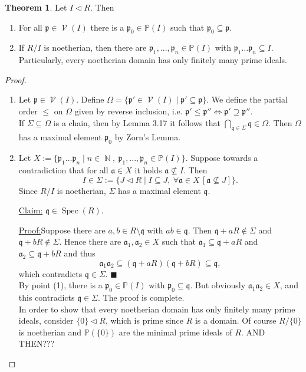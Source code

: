 \documentclass[12pt,a4paper]{report}
\theoremstyle{definition}
\newtheorem{theorem}{Theorem}[chapter] %
\theoremstyle{num.custom-title}
\newenvironment{claim}[1]{\par\noindent\underline{Claim#1:}\space}{} %
\newenvironment{claimproof}[1]{\par\noindent\underline{Proof:}\space#1}{\leavevmode\unskip\penalty9999 \hbox{}\nobreak\hfill\quad\hbox{$\blacksquare$}} %
\DeclareMathOperator{\N}{\mathbb{N}}
\DeclareMathOperator{\V}{\mathcal{V}}
\DeclareMathOperator{\sm}{\setminus}
\DeclareMathOperator{\sse}{\subseteq}
\DeclareMathOperator{\Spec}{Spec}
\newcommand{\p}{\mathfrak{p}}
\renewcommand{\P}{\mathbb{P}}
\begin{document}
\begin{theorem}
Let $I \lhd R$. Then
\begin{enumerate}
\item For all $\p \in \V(I)$ there is a $\p_0 \in \P(I)$ such that $\p_0 \sse \p$.
\item If $R/I$ is noetherian, then there are $\p_1,...,\p_n \in \P(I)$ with $\p_1 \ldots \p_n \sse I$. Particularly, every noetherian domain has only finitely many prime ideals.
\end{enumerate}
\begin{proof}\ 
\begin{enumerate}
\item Let $\p \in \V(I)$. Define $\Omega = \{ \p' \in \V(I) \mid \p' \sse \p \}$. We define the partial order $\leq$ on $\Omega$ given by reverse inclusion, i.e. $\p' \leq \p'' \Leftrightarrow \p' \supseteq \p''$.\\
If $\Sigma \sse \Omega$ is a chain, then by Lemma 3.17 it follows that $\bigcap_{\mathfrak{q} \in \Sigma} \mathfrak{q} \in \Omega$. Then $\Omega$ has a maximal element $\p_0$ by Zorn's Lemma.
\item Let $X := \{ \p_1 \ldots \p_n \mid n \in \N, \ \p_1,...,\p_n \in \P(I) \}$. Suppose towards a contradiction that for all $\mathfrak{a} \in X$ it holds $\mathfrak{a} \not\subseteq I$. Then
\[
I \in \Sigma := \Big\{ J \lhd R \mid I \sse J, \ \forall \mathfrak{a} \in X \, [\mathfrak{a} \not\subseteq J] \Big\}.
\]
Since $R/I$ is noetherian, $\Sigma$ has a maximal element $\mathfrak{q}$.
\begin{claim}{}
$\mathfrak{q} \in \Spec(R)$.
\begin{claimproof}
Suppose there are $a,b \in R \sm \mathfrak{q}$ with $ab \in \mathfrak{q}$. Then $\mathfrak{q}+aR \not\in \Sigma$ and $\mathfrak{q}+bR \not\in \Sigma$. Hence there are $\mathfrak{a}_1, \mathfrak{a}_2 \in X$ such that $\mathfrak{a}_1 \sse \mathfrak{q}+aR$ and $\mathfrak{a}_2 \sse \mathfrak{q}+bR$ and thus
\[
\mathfrak{a}_1 \mathfrak{a}_2 \sse (\mathfrak{q}+aR)(\mathfrak{q}+bR) \sse \mathfrak{q},
\]
which contradicts $\mathfrak{q} \in \Sigma$.
\end{claimproof}
\end{claim}\\
By point (1), there is a $\p_0 \in \P(I)$ with $\p_0 \sse \mathfrak{q}$. But obviously $\mathfrak{a}_1 \mathfrak{a}_2 \in X$, and this contradicts $\mathfrak{q} \in \Sigma$. The proof is complete.\\
In order to show that every noetherian domain has only finitely many prime ideals, consider $\{0\} \lhd R$, which is prime since $R$ is a domain. Of course $R/\{0\}$ is noetherian and $\P(\{0\})$ are the minimal prime ideals of $R$. AND THEN???
\end{enumerate}
\end{proof}
\end{theorem}
\end{document}
